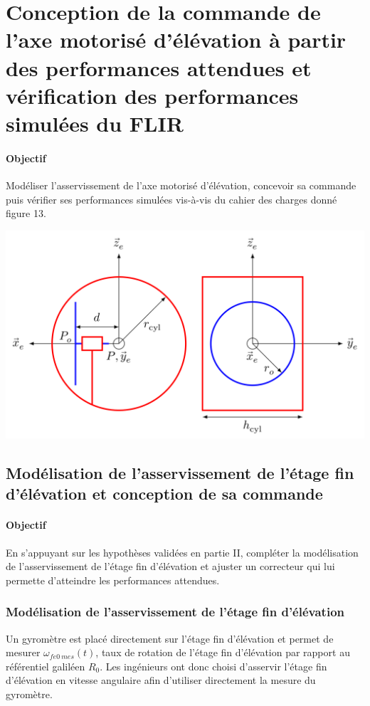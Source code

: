 \section{Conception de la commande de l'axe motorisé d'élévation à partir des performances attendues et vérification des performances simulées du FLIR}

\paragraph{Objectif} Modéliser l'asservissement de l'axe motorisé d'élévation, concevoir sa commande puis vérifier ses performances simulées vis-à-vis du cahier des charges donné figure 13.

\begin{center}
\includegraphics[width=0.7\linewidth]{img/fig11}
\end{center}

\subsection{Modélisation de l'asservissement de l'étage fin d'élévation et conception de sa commande}

\paragraph{Objectif} En s'appuyant sur les hypothèses validées en partie II, compléter la modélisation de l'asservissement de l'étage fin d'élévation et ajuster un correcteur qui lui permette d'atteindre les performances attendues.

\subsubsection{Modélisation de l'asservissement de l'étage fin d'élévation}

Un gyromètre est placé directement sur l'étage fin d'élévation et permet de mesurer $\omega_{fe0\  mes}(t)$, taux de rotation de l'étage fin d'élévation par rapport au référentiel galiléen $R_0$. Les ingénieurs ont donc choisi d'asservir l'étage fin d'élévation en vitesse angulaire afin d'utiliser directement la mesure du gyromètre.

